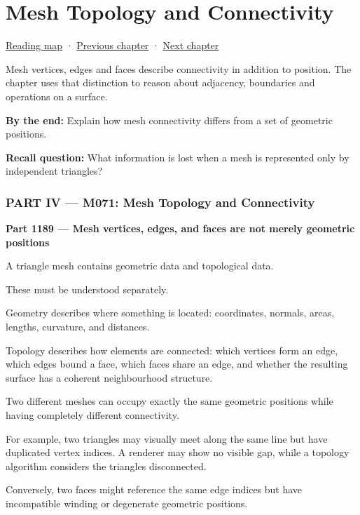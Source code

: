 \hypertarget{04-visual-computing-ii-ch023}{}
\chapter{Mesh Topology and Connectivity}\label{04-visual-computing-ii-ch023-mesh-topology-and-connectivity}

\hyperref[volume-reading-map]{Reading map} · \hyperref[04-visual-computing-ii-ch022-convex-support-mapping-and-distance]{Previous chapter} · \hyperref[04-visual-computing-ii-ch024-raytriangle-intersection]{Next chapter}

Mesh vertices, edges and faces describe connectivity in addition to position. The chapter uses that distinction to reason about adjacency, boundaries and operations on a surface.

\textbf{By the end:} Explain how mesh connectivity differs from a set of geometric positions.

\textbf{Recall question:} What information is lost when a mesh is represented only by independent triangles?

\subsection{PART IV --- M071: Mesh Topology and Connectivity}\label{04-visual-computing-ii-ch023-part-iv-m071-mesh-topology-and-connectivity}

\textbf{Part 1189 --- Mesh vertices, edges, and faces are not merely geometric positions}

A triangle mesh contains geometric data and topological data.

These must be understood separately.

Geometry describes where something is located: coordinates, normals, areas, lengths, curvature, and distances.

Topology describes how elements are connected: which vertices form an edge, which edges bound a face, which faces share an edge, and whether the resulting surface has a coherent neighbourhood structure.

Two different meshes can occupy exactly the same geometric positions while having completely different connectivity.

For example, two triangles may visually meet along the same line but have duplicated vertex indices. A renderer may show no visible gap, while a topology algorithm considers the triangles disconnected.

Conversely, two faces might reference the same edge indices but have incompatible winding or degenerate geometric positions.

